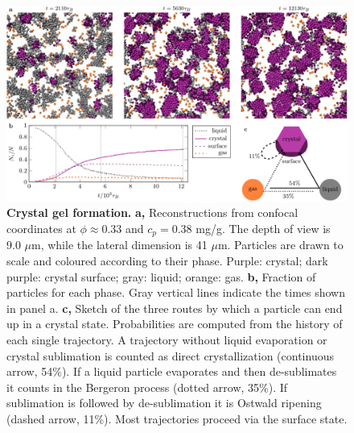 \documentclass[preprint,amsmath,amssymb,superscriptaddress]{revtex4-1}
\begin{document}

\begin{figure}
 \centering
 \includegraphics[width=16cm]{transitions}
 \caption{{\bf Crystal gel formation.}  
{\bf a,} Reconstructions from confocal coordinates at $\phi\approx 0.33$ and $c_p=0.38$ mg/g. The depth of view is 9.0 $\mu$m, while the lateral dimension is 41 $\mu$m. Particles are drawn to scale and coloured according to their phase. Purple: crystal; dark purple: crystal surface; gray: liquid; orange: gas.
{\bf b,} Fraction of particles for each phase. Gray vertical lines indicate the times shown in panel a. 
{\bf c,} Sketch of the three routes by which a particle can end up in a crystal state. 
Probabilities are computed from the history of each single trajectory. 
A trajectory without liquid evaporation or crystal sublimation is counted as direct crystallization (continuous arrow, 54\%). 
If a liquid particle evaporates and then de-sublimates it counts in the Bergeron process (dotted arrow, 35\%). 
If sublimation is followed by de-sublimation it is Ostwald ripening (dashed arrow, 11\%). 
Most trajectories proceed via the surface state.}
\label{fig:transitions}
\end{figure}
\end{document}
